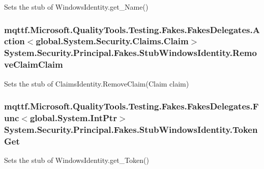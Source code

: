 Sets the stub of Windows\-Identity.\-get\-\_\-\-Name()

\hypertarget{class_system_1_1_security_1_1_principal_1_1_fakes_1_1_stub_windows_identity_a94a637564cb59d06bf093bb389c8509d}{
\subsubsection[{Remove\-Claim\-Claim}]{\setlength{\rightskip}{0pt plus 5cm}mqttf.\-Microsoft.\-Quality\-Tools.\-Testing.\-Fakes.\-Fakes\-Delegates.\-Action$<$global.\-System.\-Security.\-Claims.\-Claim$>$ System.\-Security.\-Principal.\-Fakes.\-Stub\-Windows\-Identity.\-Remove\-Claim\-Claim}}\label{class_system_1_1_security_1_1_principal_1_1_fakes_1_1_stub_windows_identity_a94a637564cb59d06bf093bb389c8509d}


Sets the stub of Claims\-Identity.\-Remove\-Claim(\-Claim claim)

\hypertarget{class_system_1_1_security_1_1_principal_1_1_fakes_1_1_stub_windows_identity_af76e77d02138c855e51a8b430d05980f}{
\subsubsection[{Token\-Get}]{\setlength{\rightskip}{0pt plus 5cm}mqttf.\-Microsoft.\-Quality\-Tools.\-Testing.\-Fakes.\-Fakes\-Delegates.\-Func$<$global.\-System.\-Int\-Ptr$>$ System.\-Security.\-Principal.\-Fakes.\-Stub\-Windows\-Identity.\-Token\-Get}}\label{class_system_1_1_security_1_1_principal_1_1_fakes_1_1_stub_windows_identity_af76e77d02138c855e51a8b430d05980f}


Sets the stub of Windows\-Identity.\-get\-\_\-\-Token()

